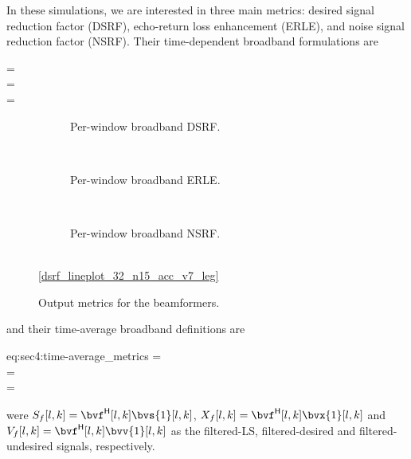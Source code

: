 In these simulations, we are interested in three main metrics: desired signal reduction factor (DSRF), echo-return loss enhancement (ERLE), and noise signal reduction factor (NSRF). Their time-dependent broadband formulations are
\begin{subgather}
	\dsrf[l] =  \\
	\erle[l] =  \\
	\nsrf[l] = 
\end{subgather}


\begin{figure}[!ht]
\begin{subfigure}{\textwidth}
	\centering
	
	\caption{Per-window broadband DSRF.}
	\label{subfig:lineplot_dsrf_32_n15_acc_v7}
\end{subfigure}\\[1em]
\begin{subfigure}{\textwidth}
	\centering
	
	\caption{Per-window broadband ERLE.}
	\label{subfig:lineplot_erle_32_n15_acc_v7}
\end{subfigure}\\[1em]
\begin{subfigure}{\textwidth}
	\centering
	
	\caption{Per-window broadband NSRF.}
	\label{subfig:lineplot_nsrf_32_n15_acc_v7}
\end{subfigure}\\[1em]
\centering\ref*{dsrf_lineplot_32_n15_acc_v7_leg}
\caption{Output metrics for the beamformers.}
\label{fig:lineplots_32_n15_acc_v7}
\end{figure}

and their time-average broadband definitions are
\begin{subgather}{eq:sec4:time-average_metrics}
	\dsrf =  \\
	\erle =  \\
	\nsrf = 
\end{subgather}
were $S_f[l,k] = \he{\bvf}[l,k] \bvs{1}[l,k]$, $X_f[l,k] = \he{\bvf}[l,k] \bvx{1}[l,k]$ and $V_f[l,k] = \he{\bvf}[l,k] \bvv{1}[l,k]$ as the filtered-LS, filtered-desired and filtered-undesired signals, respectively.

